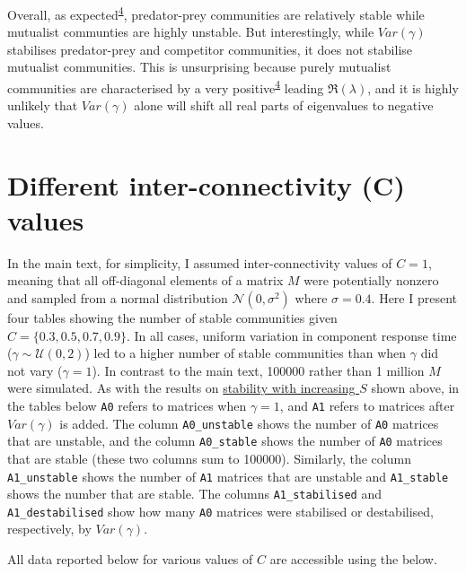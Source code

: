 \documentclass[]{article}
\begin{document}
Overall, as
expected\textsuperscript{\protect\hyperlink{ref-Allesina2012}{4}},
predator-prey communities are relatively stable while mutualist
communties are highly unstable. But interestingly, while \(Var(\gamma)\)
stabilises predator-prey and competitor communities, it does not
stabilise mutualist communities. This is unsurprising because purely
mutualist communities are characterised by a very
positive\textsuperscript{\protect\hyperlink{ref-Allesina2012}{4}}
leading \(\Re(\lambda)\), and it is highly unlikely that \(Var(\gamma)\)
alone will shift all real parts of eigenvalues to negative values.

\hypertarget{connectance}{\section{Different inter-connectivity (C)
values}\label{connectance}}

In the main text, for simplicity, I assumed inter-connectivity values of
\(C = 1\), meaning that all off-diagonal elements of a matrix \(M\) were
potentially nonzero and sampled from a normal distribution
\(\mathcal{N}(0, \sigma^{2})\) where \(\sigma = 0.4\). Here I present
four tables showing the number of stable communities given
\(C = \{0.3, 0. 5, 0.7, 0.9 \}\). In all cases, uniform variation in
component response time (\(\gamma \sim \mathcal{U}(0, 2)\)) led to a
higher number of stable communities than when \(\gamma\) did not vary
(\(\gamma = 1\)). In contrast to the main text, 100000 rather than 1
million \(M\) were simulated. As with the results on
\protect\hyperlink{IncrS}{stability with increasing \(S\)} shown above,
in the tables below \texttt{A0} refers to matrices when \(\gamma = 1\),
and \texttt{A1} refers to matrices after \(Var(\gamma)\) is added. The
column \texttt{A0\_unstable} shows the number of \texttt{A0} matrices
that are unstable, and the column \texttt{A0\_stable} shows the number
of \texttt{A0} matrices that are stable (these two columns sum to
100000). Similarly, the column \texttt{A1\_unstable} shows the number of
\texttt{A1} matrices that are unstable and \texttt{A1\_stable} shows the
number that are stable. The columns \texttt{A1\_stabilised} and
\texttt{A1\_destabilised} show how many \texttt{A0} matrices were
stabilised or destabilised, respectively, by \(Var(\gamma)\).

All data reported below for various values of \(C\) are accessible using
the below.
\end{document}
